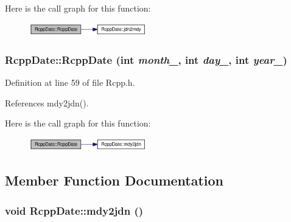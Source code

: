 Here is the call graph for this function:\nopagebreak
\begin{figure}[H]
\begin{center}
\leavevmode
\includegraphics[width=145pt]{classRcppDate_21adf306ddf84cf792f888d220bb9a3f_cgraph}
\end{center}
\end{figure}
\hypertarget{classRcppDate_8b96145664d63ec84267870787025fa4}{
\subsubsection[RcppDate]{\setlength{\rightskip}{0pt plus 5cm}RcppDate::RcppDate (int {\em month\_\-}, \/  int {\em day\_\-}, \/  int {\em year\_\-})}}
\label{classRcppDate_8b96145664d63ec84267870787025fa4}




Definition at line 59 of file Rcpp.h.

References mdy2jdn().

Here is the call graph for this function:\nopagebreak
\begin{figure}[H]
\begin{center}
\leavevmode
\includegraphics[width=145pt]{classRcppDate_8b96145664d63ec84267870787025fa4_cgraph}
\end{center}
\end{figure}


\subsection{Member Function Documentation}
\hypertarget{classRcppDate_aaa626a51e3b2eb4978caf5dcdf9df70}{
\subsubsection[mdy2jdn]{\setlength{\rightskip}{0pt plus 5cm}void RcppDate::mdy2jdn ()}}
\label{classRcppDate_aaa626a51e3b2eb4978caf5dcdf9df70}




